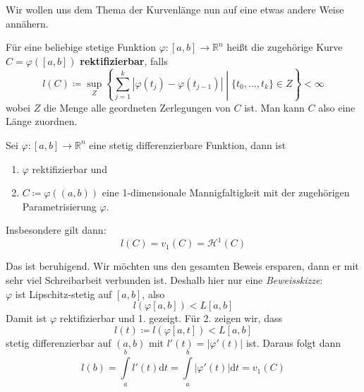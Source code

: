 Wir wollen uns dem Thema der Kurvenlänge nun auf eine etwas andere Weise annähern.
\begin{definition}[Rektifizierbarkeit]
Für eine beliebige stetige Funktion $\varphi:[a,b]\rightarrow\mathbb{R}^n$ 
heißt die zugehörige Kurve $C=\varphi([a,b])$ \textbf{rektifizierbar}, 
falls 
\begin{equation*}
	l(C)\coloneqq\sup_Z\left\{\sum\limits_{j=1}^k |\varphi(t_j)-\varphi(t_{j-1})| \middle| \{t_0,...,t_k\}\in Z\right\} < \infty
\end{equation*}
wobei $Z$ die Menge alle geordneten Zerlegungen von $C$ ist. 
Man kann $C$ also eine Länge zuordnen.
\end{definition}

\begin{satz}
Sei $\varphi:[a,b]\rightarrow\mathbb{R}^n$ eine 
stetig differenzierbare Funktion, dann ist 
\begin{enumerate}
	\item $\varphi$ rektifizierbar und
	\item $C\coloneqq\varphi((a,b))$ eine 1-dimensionale Mannigfaltigkeit 
	mit der zugehörigen Parametrisierung $\varphi$.
\end{enumerate}
Insbesondere gilt dann:
\begin{equation*}
	l(C)=v_1(C)=\mathcal{H}^1(C)
\end{equation*}
\end{satz}

Das ist beruhigend. Wir möchten uns den gesamten Beweis ersparen, dann 
er mit sehr viel Schreibarbeit verbunden ist. Deshalb hier nur eine 
\emph{Beweisskizze}:\\
$\varphi$ ist Lipschitz-stetig auf $[a,b]$, also 
\begin{equation*}
	l(\varphi[a,b])<L[a,b]
\end{equation*}
Damit ist $\varphi$ rektifizierbar und 1. gezeigt. Für 2. zeigen wir, dass
\begin{equation*}
	l(t)\coloneqq l(\varphi[a,t])<L[a,b] 
\end{equation*}
stetig differenzierbar auf $(a,b)$ mit $l'(t)=|\varphi'(t)|$ ist. 
Daraus folgt dann 
\begin{equation*}
	l(b)=\int\limits_a^bl'(t)\mathrm{d}t = 
	\int\limits_a^b|\varphi'(t)|\mathrm{d}t = 
	v_1(C)
\end{equation*}


